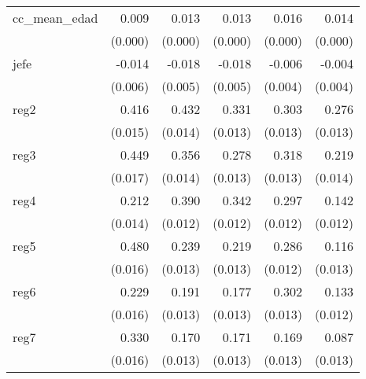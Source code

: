 {\begin{longtable}{l*{5}{D{.}{.}{-1}}}
\addlinespace
cc\_mean\_edad&       0.009\sym{***}&       0.013\sym{***}&       0.013\sym{***}&       0.016\sym{***}&       0.014\sym{***}\\
            &     (0.000)         &     (0.000)         &     (0.000)         &     (0.000)         &     (0.000)         \\
\addlinespace
jefe        &      -0.014\sym{*}  &      -0.018\sym{***}&      -0.018\sym{***}&      -0.006         &      -0.004         \\
            &     (0.006)         &     (0.005)         &     (0.005)         &     (0.004)         &     (0.004)         \\
\addlinespace
reg2        &       0.416\sym{***}&       0.432\sym{***}&       0.331\sym{***}&       0.303\sym{***}&       0.276\sym{***}\\
            &     (0.015)         &     (0.014)         &     (0.013)         &     (0.013)         &     (0.013)         \\
\addlinespace
reg3        &       0.449\sym{***}&       0.356\sym{***}&       0.278\sym{***}&       0.318\sym{***}&       0.219\sym{***}\\
            &     (0.017)         &     (0.014)         &     (0.013)         &     (0.013)         &     (0.014)         \\
\addlinespace
reg4        &       0.212\sym{***}&       0.390\sym{***}&       0.342\sym{***}&       0.297\sym{***}&       0.142\sym{***}\\
            &     (0.014)         &     (0.012)         &     (0.012)         &     (0.012)         &     (0.012)         \\
\addlinespace
reg5        &       0.480\sym{***}&       0.239\sym{***}&       0.219\sym{***}&       0.286\sym{***}&       0.116\sym{***}\\
            &     (0.016)         &     (0.013)         &     (0.013)         &     (0.012)         &     (0.013)         \\
\addlinespace
reg6        &       0.229\sym{***}&       0.191\sym{***}&       0.177\sym{***}&       0.302\sym{***}&       0.133\sym{***}\\
            &     (0.016)         &     (0.013)         &     (0.013)         &     (0.013)         &     (0.012)         \\
\addlinespace
reg7        &       0.330\sym{***}&       0.170\sym{***}&       0.171\sym{***}&       0.169\sym{***}&       0.087\sym{***}\\
            &     (0.016)         &     (0.013)         &     (0.013)         &     (0.013)         &     (0.013)         \\

\end{longtable}}
